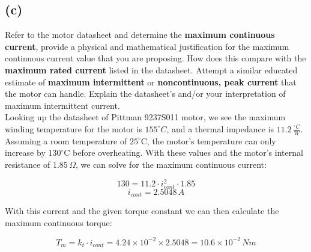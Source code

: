 \documentclass[letterpaper]{article}
\begin{document}
\subsection*{(c)}
Refer to the motor datasheet and determine the \textbf{maximum continuous current}, provide a physical and mathematical justification for the maximum continuous current value that you are proposing. How does this compare with the \textbf{maximum rated current} listed in the datasheet. Attempt a similar educated estimate of \textbf{maximum intermittent} or \textbf{noncontinuous, peak current} that the motor can handle. Explain the datasheet's and/or your interpretation of maximum intermittent current.\\

Looking up the datasheet of Pittman 9237S011 motor, we see the maximum winding temperature for the motor is $155 ^\circ C$, and a thermal impedance is $11.2 \, \tfrac{^\circ C}{W}$.  Assuming a room temperature of $25^\circ$C, the motor's temperature can only increase by $130^\circ$C before overheating. With these values and the motor's internal resistance of $1.85 \, \Omega$, we can solve for the maximum continuous current:

$$130 = 11.2\cdot i_{cont}^2 \cdot 1.85$$
$$i_{cont} = 2.5048 \,A$$

With this current and the given torque constant we can then calculate the maximum continuous torque:

$$T_{m} = k_{t} \cdot i_{cont} = 4.24\times 10^{-2}\times 2.5048 = 10.6\times 10^{-2}\, Nm$$
\end{document}
